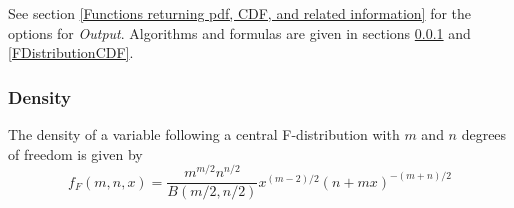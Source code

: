 \vspace{0.3cm}
See section \ref{Functions returning pdf, CDF, and related information} for the options for {\itshape\sffamily Output}. Algorithms and formulas are given in sections \ref{FDistributionDensity} and \ref{FDistributionCDF}.


%
%
%







\subsubsection{Density}
\label{FDistributionDensity}
The density of a variable following a central F-distribution with  $m$ and $n$  degrees of freedom is given by
\begin{equation}
	f_F(m,n,x) = \frac{m^{m/2} n^{n/2}}{B(m/2,n/2)} x^{(m-2)/2} (n+mx)^{-(m+n)/2}
\end{equation}

